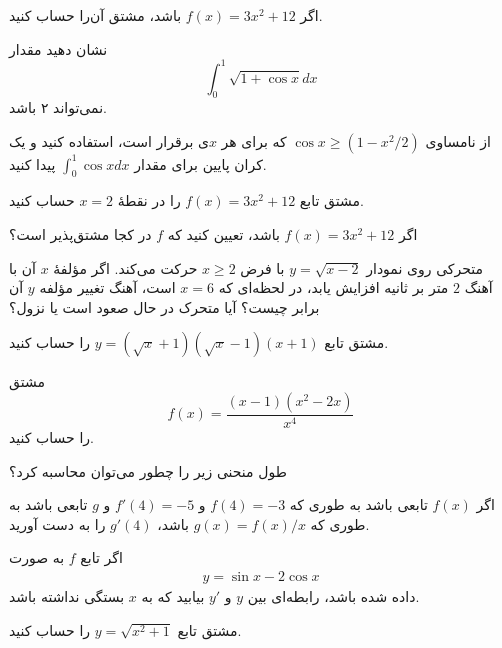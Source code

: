 \begin{pproblems}[تمرین‌ها]
\item \label{p1-1}
اگر  $f(x)=3x^2+12$ باشد، مشتق آن‌را حساب کنید.
\item \label{p1-2}
نشان دهید مقدار 
\[
\int_0 ^1\sqrt{1+\cos x} dx
\]
نمی‌تواند ۲ باشد.
\item \label{p1-3}
از نامساوی 
$\cos x\geq (1-x^2/2)$
که برای هر $x$ی برقرار است، استفاده کنید و یک کران پایین برای مقدار 
$\int _0 ^1 \cos x  dx$
پیدا کنید.
\item \label{p1-4}
مشتق تابع $f(x)=3x^2+12$ را در نقطهٔ $x=2$ حساب کنید.
\item \label{p1-5}
اگر $f(x)=3x^2+12$ باشد، تعیین کنید که $f$ در کجا مشتق‌پذیر است؟
\item \label{p1-6}
متحرکی روی نمودار $y=\sqrt{x-2}$ با فرض $x\geq 2$ حرکت می‌کند. اگر مؤلفهٔ $x$ آن با آهنگ $2$ متر بر ثانیه
افزایش یابد، در لحظه‌ای که $x=6$ است، آهنگ تغییر مؤلفه $y$ آن برابر چیست؟ آیا متحرک در حال صعود است یا نزول؟
\item \label{p1-7}
مشتق تابع 
$y=(\sqrt{x}+1)(\sqrt{x}-1)(x+1)$
را حساب کنید.
\item \label{p1-8}
مشتق 
\[
f(x)=\dfrac{(x-1)(x^2-2x)}{x^4}
\]
را حساب کنید. 
\item \label{p1-9}
طول منحنی زیر را چطور می‌توان محاسبه کرد؟
\begin{center}
\end{center}


\item \label{p1-10}
اگر $f(x)$ تابعی باشد به طوری که $f(4)=-3$ و 
$f'(4)=-5$ 
و $g$ تابعی باشد به طوری که $g(x)=f(x)/x$ باشد، $g'(4)$ را به دست آورید.
\item \label{p1-11}
اگر تابع $f$ به صورت
\begin{align}\label{cex1}
y=\sin x-2\cos x
 \end{align}
  داده شده باشد، رابطه‌ای بین $y$ و $y'$ بیابید که به $x$
بستگی نداشته باشد.
\item \label{p1-12}
مشتق تابع $y=\sqrt{x^2+1}$ را حساب کنید.
\item \label{p1-13}


\end{pproblems}

